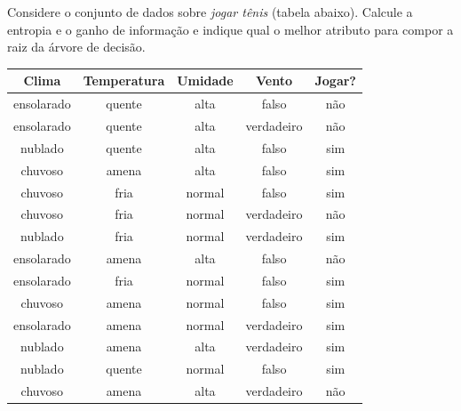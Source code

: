 \begin{exercise}
Considere o conjunto de dados sobre \textit{jogar tênis} (tabela abaixo). Calcule a entropia e o ganho de informação e indique qual o melhor atributo para compor a raiz da árvore de decisão.

\insertspace

\begin{table}[h]
	\centering
	\def\arraystretch{1.3}
	\begin{tabular}{ccccc}
		\hline
		\textbf{Clima} & \textbf{Temperatura} & \textbf{Umidade} & \textbf{Vento} & \textbf{Jogar?} \\ \hline
		  ensolarado   &        quente        &       alta       &     falso      &       não       \\
		  ensolarado   &        quente        &       alta       &   verdadeiro   &       não       \\
		   nublado     &        quente        &       alta       &     falso      &       sim       \\
		   chuvoso     &        amena         &       alta       &     falso      &       sim       \\
		   chuvoso     &         fria         &      normal      &     falso      &       sim       \\
		   chuvoso     &         fria         &      normal      &   verdadeiro   &       não       \\
		   nublado     &         fria         &      normal      &   verdadeiro   &       sim       \\
		  ensolarado   &        amena         &       alta       &     falso      &       não       \\
		  ensolarado   &         fria         &      normal      &     falso      &       sim       \\
		   chuvoso     &        amena         &      normal      &     falso      &       sim       \\
		  ensolarado   &        amena         &      normal      &   verdadeiro   &       sim       \\
		   nublado     &        amena         &       alta       &   verdadeiro   &       sim       \\
		   nublado     &        quente        &      normal      &     falso      &       sim       \\
		   chuvoso     &        amena         &       alta       &   verdadeiro   &       não       \\ \hline
	\end{tabular}
\end{table}
\end{exercise}

